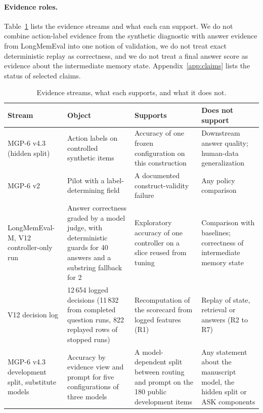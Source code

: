 \paragraph{Evidence roles.} Table~\ref{tab:roles} lists the evidence streams and what each can support. We do not combine action-label evidence from the synthetic diagnostic with answer evidence from LongMemEval into one notion of validation, we do not treat exact deterministic replay as correctness, and we do not treat a final answer score as evidence about the intermediate memory state. Appendix~\ref{app:claims} lists the status of selected claims.

\begin{table}[t]
\centering\small
\caption{Evidence streams, what each supports, and what it does not.}
\label{tab:roles}
\begin{tabular}{p{2.6cm}p{3.7cm}p{3.7cm}p{3.7cm}}
\toprule
Stream & Object & Supports & Does not support \\
\midrule
MGP-6 v4.3 (hidden split) & Action labels on controlled synthetic items & Accuracy of one frozen configuration on this construction & Downstream answer quality; human-data generalization \\
MGP-6 v2 & Pilot with a label-determining field & A documented construct-validity failure & Any policy comparison \\
LongMemEval-M, V12 controller-only run & Answer correctness graded by a model judge, with deterministic guards for 40 answers and a substring fallback for 2 & Exploratory accuracy of one controller on a slice reused from tuning & Comparison with baselines; correctness of intermediate memory state \\
V12 decision log & 12\,654 logged decisions (11\,832 from completed question runs, 822 replayed rows of stopped runs) & Recomputation of the scorecard from logged features (R1) & Replay of state, retrieval or answers (R2 to R7) \\
MGP-6 v4.3 development split, substitute models & Accuracy by evidence view and prompt for five configurations of three models & A model-dependent split between routing and prompt on the 180 public development items & Any statement about the manuscript model, the hidden split or ASK components \\
\bottomrule
\end{tabular}
\end{table}
